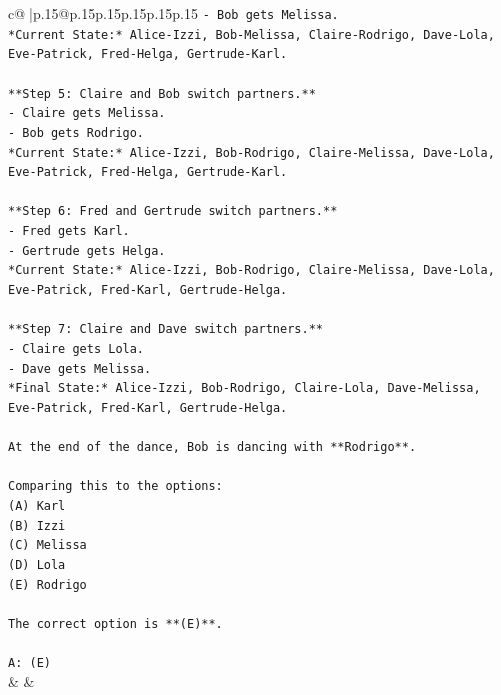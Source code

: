 \documentclass{article}
\begin{document}
{\begin{supertabular}{c@{$\;$}|p{.15\linewidth}@{}p{.15\linewidth}p{.15\linewidth}p{.15\linewidth}p{.15\linewidth}p{.15\linewidth}}
{{{\texttt{{-} Bob gets Melissa.} \\
\texttt{*Current State:* Alice{-}Izzi, Bob{-}Melissa, Claire{-}Rodrigo, Dave{-}Lola, Eve{-}Patrick, Fred{-}Helga, Gertrude{-}Karl.} \\
\\ 
\texttt{**Step 5: Claire and Bob switch partners.**} \\
\texttt{{-} Claire gets Melissa.} \\
\texttt{{-} Bob gets Rodrigo.} \\
\texttt{*Current State:* Alice{-}Izzi, Bob{-}Rodrigo, Claire{-}Melissa, Dave{-}Lola, Eve{-}Patrick, Fred{-}Helga, Gertrude{-}Karl.} \\
\\ 
\texttt{**Step 6: Fred and Gertrude switch partners.**} \\
\texttt{{-} Fred gets Karl.} \\
\texttt{{-} Gertrude gets Helga.} \\
\texttt{*Current State:* Alice{-}Izzi, Bob{-}Rodrigo, Claire{-}Melissa, Dave{-}Lola, Eve{-}Patrick, Fred{-}Karl, Gertrude{-}Helga.} \\
\\ 
\texttt{**Step 7: Claire and Dave switch partners.**} \\
\texttt{{-} Claire gets Lola.} \\
\texttt{{-} Dave gets Melissa.} \\
\texttt{*Final State:* Alice{-}Izzi, Bob{-}Rodrigo, Claire{-}Lola, Dave{-}Melissa, Eve{-}Patrick, Fred{-}Karl, Gertrude{-}Helga.} \\
\\ 
\texttt{At the end of the dance, Bob is dancing with **Rodrigo**.} \\
\\ 
\texttt{Comparing this to the options:} \\
\texttt{(A) Karl} \\
\texttt{(B) Izzi} \\
\texttt{(C) Melissa} \\
\texttt{(D) Lola} \\
\texttt{(E) Rodrigo} \\
\\ 
\texttt{The correct option is **(E)**.} \\
\\ 
\texttt{A: (E)} \\
            }
        }
    }
    & & \\ \\


\end{supertabular}}
\end{document}
